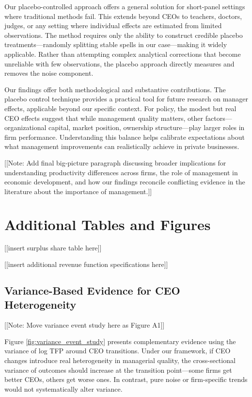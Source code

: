 \documentclass[11pt,a4paper]{article}
\begin{document}
Our placebo-controlled approach offers a general solution for short-panel settings where traditional methods fail. This extends beyond CEOs to teachers, doctors, judges, or any setting where individual effects are estimated from limited observations. The method requires only the ability to construct credible placebo treatments—randomly splitting stable spells in our case—making it widely applicable. Rather than attempting complex analytical corrections that become unreliable with few observations, the placebo approach directly measures and removes the noise component.

Our findings offer both methodological and substantive contributions. The placebo control technique provides a practical tool for future research on manager effects, applicable beyond our specific context. For policy, the modest but real CEO effects suggest that while management quality matters, other factors—organizational capital, market position, ownership structure—play larger roles in firm performance. Understanding this balance helps calibrate expectations about what management improvements can realistically achieve in private businesses.

[[Note: Add final big-picture paragraph discussing broader implications for understanding productivity differences across firms, the role of management in economic development, and how our findings reconcile conflicting evidence in the literature about the importance of management.]]




\appendix

\section{Additional Tables and Figures}

[[insert surplus share table here]]

[[insert additional revenue function specifications here]]

\subsection{Variance-Based Evidence for CEO Heterogeneity}

[[Note: Move variance event study here as Figure A1]]

Figure \ref{fig:variance_event_study} presents complementary evidence using the variance of log TFP around CEO transitions. Under our framework, if CEO changes introduce real heterogeneity in managerial quality, the cross-sectional variance of outcomes should increase at the transition point—some firms get better CEOs, others get worse ones. In contrast, pure noise or firm-specific trends would not systematically alter variance.
\end{document}
